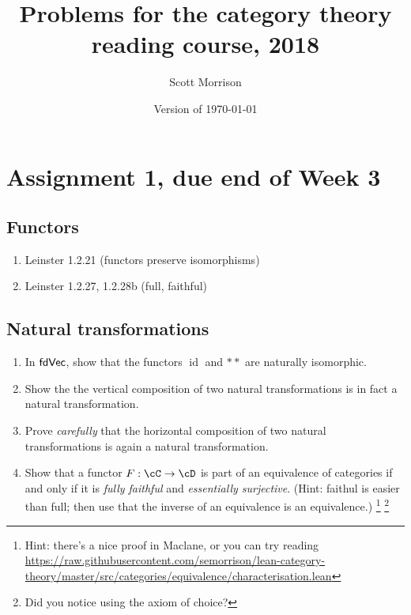 \documentclass[12pt]{amsart}
\begin{document}
\title{Problems for the category theory reading course, 2018}
\author{Scott Morrison}
  \address[Scott Morrison]{
  	Mathematical Sciences Institute,
  	Australian National University
  }
\date{Version of \today}

\maketitle

\section{Assignment 1, due end of Week 3}

\subsection{Functors}
\begin{enumerate}
\item Leinster 1.2.21 (functors preserve isomorphisms)
\item Leinster 1.2.27, 1.2.28b (full, faithful)
\end{enumerate}

\subsection{Natural transformations}
\begin{enumerate}
\item In $\sf{fdVec}$, show that the functors $\operatorname{id}$ and $**$ are naturally isomorphic. 
\item Show the the vertical composition of two natural transformations is in fact a natural transformation. 
\item Prove \emph{carefully} that the horizontal composition of two natural transformations is again a natural transformation.
\item Show that a functor $F : \cC \to \cD$ is part of an equivalence of categories if and only if it is \emph{fully faithful} and \emph{essentially surjective}. (Hint: faithul is easier than full; then use that the inverse of an equivalence is an equivalence.) \footnote{Hint: there's a nice proof in Maclane, or you can try reading \url{https://raw.githubusercontent.com/semorrison/lean-category-theory/master/src/categories/equivalence/characterisation.lean}} \footnote{Did you notice using the axiom of choice?}
\end{enumerate}
\end{document}
